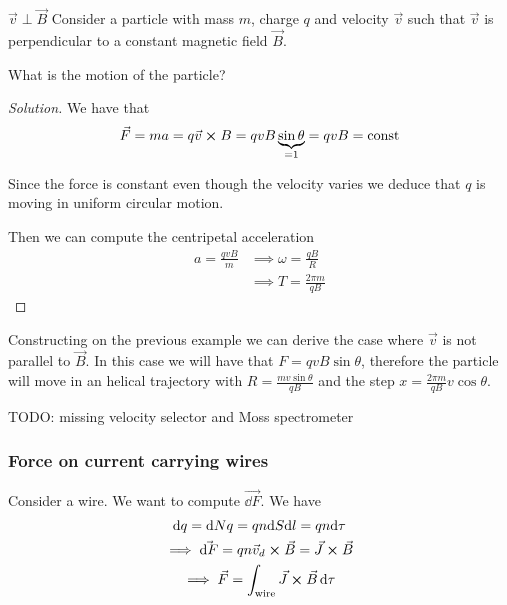 \documentclass[12pt]{extarticle}
\begin{document}
\begin{example}{$\vec v \perp \vec B$}{}
	Consider a particle with mass $m$, charge $q$ and velocity $\vec v$
	such that $\vec v$ is perpendicular to a constant magnetic field $\vec B$.

	What is the motion of the particle?
\end{example}

\begin{proof}[Solution]
	We have that
	\begin{equation}
		\vec F = ma = q \vec v \cross B = q v B \underbrace{\sin \theta}_{= 1} = q v B = \text{const}
	\end{equation}

	Since the force is constant even though the velocity varies we deduce that $q$
	is moving in uniform circular motion.

	Then we can compute the centripetal acceleration
	\begin{align}
		a = \frac{q v B}{m} & \implies \omega = \frac{qB}{R}   \\
		                    & \implies T = \frac{2 \pi m}{q B}
	\end{align}
\end{proof}

Constructing on the previous example we can derive the case where $\vec v$ is not parallel to $\vec B$.
In this case we will have that $F = qvB \sin \theta$,
therefore the particle will move in an helical trajectory with
$R = \frac{mv \sin \theta}{q B}$ and the step $x = \frac{2 \pi m}{q B} v \cos \theta$.

TODO: missing velocity selector and Moss spectrometer

\subsubsection{Force on current carrying wires}

Consider a wire. We want to compute $\vec{\dd F}$.
We have
\begin{gather}
	\dd q = \dd N q = q n \dd S \dd l = qn \dd \tau \\
	\implies \vec{\dd F} = q n \vec v_d \cross \vec B = \vec J \cross \vec B \\
	\implies \vec F = \int_\text{wire} \vec J \cross \vec B \dd{\tau}
\end{gather}
\end{document}
